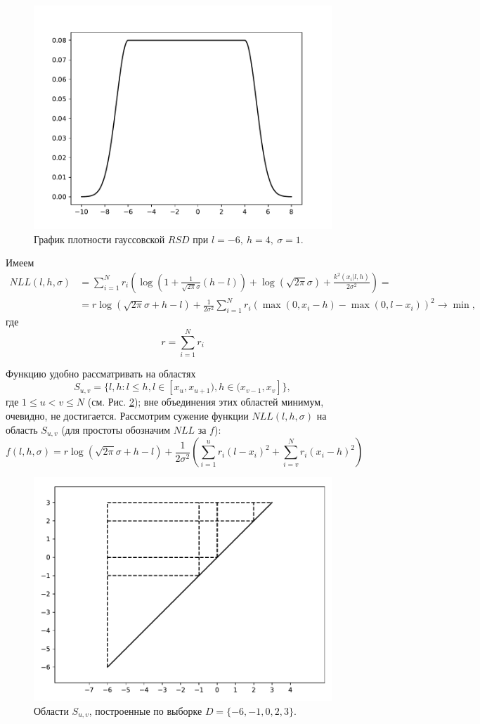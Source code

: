 \documentclass[12pt]{article}
\theoremstyle{definition}
\theoremstyle{plain}
\begin{document}
\begin{figure}
\centering
\includegraphics[width=0.6\linewidth]{RSD_normal.pdf}
\caption{График плотности гауссовской $RSD$ при $l = -6,~h = 4,~\sigma=1$.}
\label{RSD_normal}
\end{figure}

Имеем
\begin{align*}
NLL(l, h, \sigma) &=
\sum_{i = 1}^N r_i \left(
\log \left( 1 + \frac{1}{\sqrt{2 \pi} \sigma} (h - l) \right) +
\log \left( \sqrt{2 \pi} \sigma \right) + \frac{k^2(x_i | l, h)}{2 \sigma^2}
\right) = \\
&= r \log \left( \sqrt{2 \pi} \sigma + h - l \right) +
\frac{1}{2 \sigma^2} 
\sum_{i = 1}^N r_i \left( \max(0, x_i - h) - \max(0, l - x_i) \right)^2
\rightarrow \min,
\end{align*}
где
$$
r = \sum_{i = 1}^N r_i
$$

Функцию удобно рассматривать на областях
$$
S_{u,v} = \{l, h: l \leq h, l \in [x_u, x_{u+1}), h \in (x_{v-1}, x_v] \},
$$
где $1 \leq u < v \leq N$ (см. Рис. \ref{regions}); вне объединения этих областей минимум,
очевидно, не достигается. Рассмотрим сужение функции $NLL(l, h, \sigma)$
на область $S_{u,v}$ (для простоты обозначим $NLL$ за $f$):
$$
f(l, h, \sigma) = r \log \left( \sqrt{2 \pi} \sigma + h - l \right) +
\frac{1}{2 \sigma^2} \left(
\sum_{i = 1}^u r_i (l - x_i)^2 + \sum_{i = v}^N r_i (x_i - h)^2
\right)
$$

\begin{figure}
\centering
\includegraphics[width=0.6\linewidth]{regions.pdf}
\caption{Области $S_{u,v}$, построенные по выборке $D = \{-6, -1, 0, 2, 3\}$.}
\label{regions}
\end{figure}
\end{document}
